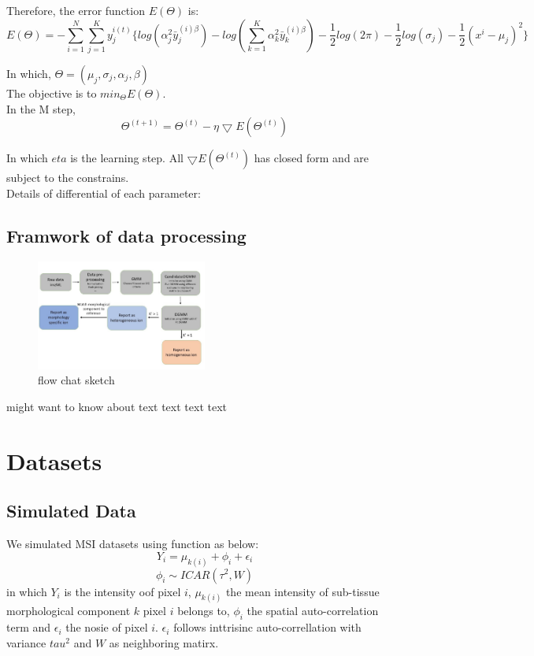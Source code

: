 \documentclass{bioinfo}
\begin{document}
Therefore, the error function $E(\Theta )$ is:
$$E(\Theta )=-\sum_{i=1}^{N}\sum_{j=1}^{K}y^{i(t)}_j\{log(\alpha_j^2\bar{y}^{(i)\beta}_j)-log(\sum_{k=1}^{K}\alpha_k^2\bar{y}^{(i)\beta}_k)-\frac{1}{2}log(2\pi)-\frac{1}{2}log(\sigma_j)-\frac{1}{2}(x^i-\mu_j)^2\}$$

In which, $\Theta =(\mu_j, \sigma_j, \alpha_j, \beta)$\\

The objective is to $min_\Theta E(\Theta)$.\\


In the M step,
$$\Theta ^{(t+1)}=\Theta ^{(t)}-\eta \bigtriangledown E(\Theta ^{(t)})$$

In which $eta$ is the learning step. All $\bigtriangledown E(\Theta ^{(t)})$ has closed form and are subject to the constrains.\\
Details of differential of each parameter:
$$$$

\subsection{Framwork of data processing}

\begin{figure}[b!]

	\includegraphics[width=0.5\textwidth]{figure3.jpg}
    \caption{flow chat sketch}
    \label{fig:figure3}
\end{figure}
\citealp{Boffelli03} might want to know about text text text
text\vspace*{1pt}




\section{Datasets}

\subsection{Simulated Data}
We simulated MSI datasets using function as below:
$$Y_{i}=\mu_{k(i)}+ \phi_i + \epsilon_i $$
$$ \phi_i  \sim ICAR (\tau^2, W) $$
in which $Y_i$ is the intensity oof pixel $i$, $\mu_{k(i)}$ the mean intensity of sub-tissue morphological component $k$ pixel $i$ belongs to, $\phi_i$ the spatial auto-correlation term and $\epsilon_i$ the nosie of pixel $i$. $\epsilon_i$ follows inttrisinc auto-correllation with variance $tau^2$ and $W$ as neighboring matirx.
\end{document}

